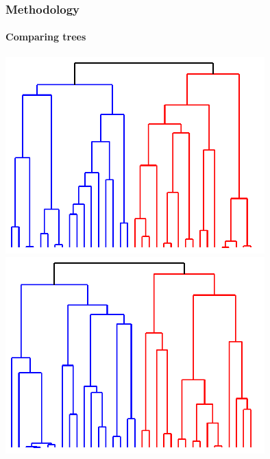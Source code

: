 \documentclass{tum-presentation}
\begin{document}
\begin{frame} 
	\frametitle{Methodology}
	\framesubtitle{Comparing trees}
	\begin{center}
		\includegraphics[width = 10cm]{../figures/karate-paris.pdf}\hspace{.5cm}\vline\hspace{.5cm}
		\includegraphics[width = 10cm]{../figures/karate-ward.pdf}
	\end{center}
\end{frame}
\end{document}
